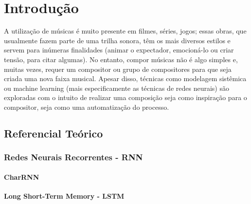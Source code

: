\documentclass{automatextcc}
\begin{document}
\listoftables


\chapter{Introdução}

A utilização de músicas é muito presente em filmes, séries, jogos; essas obras, que usualmente fazem parte de uma trilha sonora, têm os mais diversos estilos e servem para inúmeras finalidades (animar o expectador, emocioná-lo ou criar tensão, para citar algumas). No entanto, compor músicas não é algo simples e, muitas vezes, requer um compositor ou grupo de compositores para que seja criada uma nova faixa musical. Apesar disso, técnicas como modelagem sistêmica \citep[veja][]{da2017modelagem} ou machine learning (mais especificamente as técnicas de redes neurais) são exploradas com o intuito de realizar uma composição \citep[ver em][]{agarwala2017music} seja como inspiração para o compositor, seja como uma automatização do processo.





\section{Referencial Teórico}

\subsection{Redes Neurais Recorrentes - RNN}

\subsubsection{CharRNN}
\subsubsection{Long Short-Term Memory - LSTM}
\end{document}
